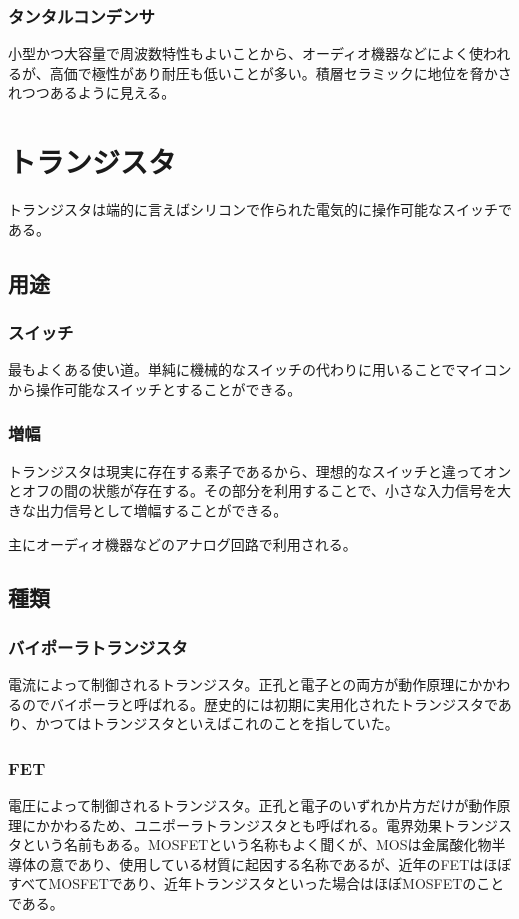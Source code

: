 \documentclass[a4paper,titlepage,here]{ujarticle}
\begin{document}
\subsubsection{タンタルコンデンサ}
小型かつ大容量で周波数特性もよいことから、オーディオ機器などによく使われるが、高価で極性があり耐圧も低いことが多い。積層セラミックに地位を脅かされつつあるように見える。
\section{トランジスタ}
トランジスタは端的に言えばシリコンで作られた電気的に操作可能なスイッチである。
\subsection{用途}
\subsubsection{スイッチ}
最もよくある使い道。単純に機械的なスイッチの代わりに用いることでマイコンから操作可能なスイッチとすることができる。
\subsubsection{増幅}
トランジスタは現実に存在する素子であるから、理想的なスイッチと違ってオンとオフの間の状態が存在する。その部分を利用することで、小さな入力信号を大きな出力信号として増幅することができる。

主にオーディオ機器などのアナログ回路で利用される。
\subsection{種類}
\subsubsection{バイポーラトランジスタ}
電流によって制御されるトランジスタ。正孔と電子との両方が動作原理にかかわるのでバイポーラと呼ばれる。歴史的には初期に実用化されたトランジスタであり、かつてはトランジスタといえばこれのことを指していた。
\subsubsection{FET}
電圧によって制御されるトランジスタ。正孔と電子のいずれか片方だけが動作原理にかかわるため、ユニポーラトランジスタとも呼ばれる。電界効果トランジスタという名前もある。MOSFETという名称もよく聞くが、MOSは金属酸化物半導体の意であり、使用している材質に起因する名称であるが、近年のFETはほぼすべてMOSFETであり、近年トランジスタといった場合はほぼMOSFETのことである。
\end{document}
